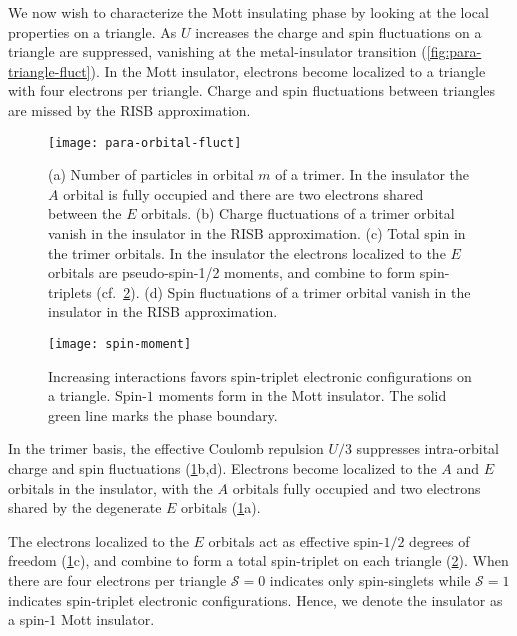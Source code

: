 \documentclass[reprint,aps,prb,amsmath,amssymb]{revtex4-2}
\begin{document}
We now wish to characterize the Mott insulating phase by looking at the local properties on a triangle. As $U$ increases the charge and spin fluctuations on a triangle are suppressed, vanishing at the metal-insulator transition (\cref{fig:para-triangle-fluct}). In the Mott insulator, electrons become localized to a triangle with four electrons per triangle. Charge and spin fluctuations between triangles are missed by the RISB approximation.

\begin{figure}
	\centering
	\texttt{[image: para-orbital-fluct]}
	\caption{\label{fig:para-orbital-fluct}
		(a) Number of particles in orbital $m$ of a trimer. In the insulator the $A$ orbital is fully occupied and there are two electrons shared between the $E$ orbitals.
		(b) Charge fluctuations of a trimer orbital vanish in the insulator in the RISB approximation.
		(c) Total spin in the trimer orbitals. In the insulator the electrons localized to the $E$ orbitals are pseudo-spin-1/2 moments, and combine to form spin-triplets (cf.~\cref{fig:spin-moment}).
		(d) Spin fluctuations of a trimer orbital vanish in the insulator in the RISB approximation.
	}
\end{figure}

\begin{figure}
	\centering
	\texttt{[image: spin-moment]}
	\caption{\label{fig:spin-moment}
	Increasing interactions favors spin-triplet electronic configurations on a triangle. Spin-$1$ moments form in the Mott insulator. The solid green line marks the phase boundary.
	}
\end{figure}


In the trimer basis, the effective Coulomb repulsion $U/3$ suppresses intra-orbital charge and spin fluctuations (\cref{fig:para-orbital-fluct}b,d). Electrons become localized to the $A$ and $E$ orbitals in the insulator, with the $A$ orbitals fully occupied and two electrons shared by the degenerate $E$ orbitals (\cref{fig:para-orbital-fluct}a).

The electrons localized to the $E$ orbitals act as effective spin-$1/2$ degrees of freedom (\cref{fig:para-orbital-fluct}c), and combine to form a total spin-triplet on each triangle (\cref{fig:spin-moment}). When there are four electrons per triangle $\mathcal{S} = 0$ indicates only spin-singlets while $\mathcal{S} = 1$ indicates spin-triplet electronic configurations. Hence, we denote the insulator as a spin-$1$ Mott insulator.
\end{document}
